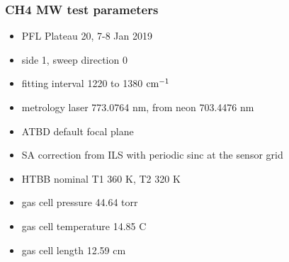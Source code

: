 \documentclass[10pt]{beamer}
\begin{document}
\begin{frame}
\frametitle{CH4 MW test parameters}

\begin{itemize}
  \item PFL Plateau 20, 7-8 Jan 2019
  \item side 1, sweep direction 0
  \item fitting interval 1220 to 1380 $\mbox{cm$^{-1}$}$
  \item metrology laser 773.0764 nm, from neon 703.4476 nm
  \item ATBD default focal plane
  \item SA correction from ILS with periodic sinc at the sensor grid
  \item HTBB nominal T1 360 K, T2 320 K
  \item gas cell pressure 44.64 torr
  \item gas cell temperature 14.85 C
  \item gas cell length 12.59 cm
\end{itemize}

\end{frame}
\end{document}
